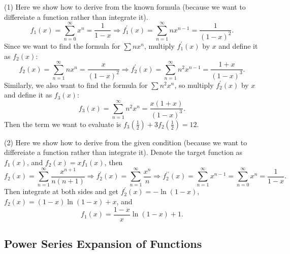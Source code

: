 \begin{solution}
  (1) Here we show how to derive from the known formula
  (because we want to differeiate a function rather than integrate it).
  \begin{equation}
    f_1(x) = \sum\limits_{n = 0}^{\infty} x^n = \frac{1}{1-x}
    \Rightarrow
    f_1^{\prime}(x) = \sum\limits_{n = 1}^{\infty} nx^{n-1} = \frac{1}{(1-x)^2}.
  \end{equation}
  Since we want to find the formula for $\sum nx^n$, multiply $f_1^{\prime}(x)$
  by $x$ and define it as $f_2(x)$:
  \begin{equation}
    f_2(x) = \sum\limits_{n = 1}^{\infty} nx^n = \frac{x}{(1-x)^2}
    \Rightarrow
    f_2^{\prime}(x) = \sum\limits_{n = 1}^{\infty} n^2x^{n-1} = \frac{1+x}{(1-x)^3}.
  \end{equation}
  Similarly, we also want to find the formula for $\sum n^2x^n$, so multiply $f_2^{\prime}(x)$
  by $x$ and define it as $f_3(x)$:
  \begin{equation}
    f_3(x) = \sum\limits_{n = 1}^{\infty} n^2x^n = \frac{x(1+x)}{(1-x)^3}.
  \end{equation}
  Then the term we want to evaluate is $f_3(\frac{1}{2}) + 3f_2(\frac{1}{2}) = 12$.

  (2) Here we show how to derive from the given condition
  (because we want to differeiate a function rather than integrate it).
  Denote the target function as $f_1(x)$, and $f_2(x) = xf_1(x)$, then
  \begin{equation}
    f_2(x) = \sum\limits_{n = 1}^{\infty} \frac{x^{n+1}}{n(n+1)}
    \Rightarrow f_2^{\prime}(x) = \sum\limits_{n = 1}^{\infty} \frac{x^n}{n}
    \Rightarrow f_2^{\prime\prime}(x) = \sum\limits_{n = 1}^{\infty} x^{n-1} = \sum\limits_{n = 0}^{\infty}x^n = \frac{1}{1-x}.
  \end{equation}
  Then integrate at both sides and get $f_2^{\prime}(x) = -\ln(1-x)$, $f_2(x) =
  (1-x)\ln(1-x) + x$, and
  \begin{equation}
    f_1(x) = \frac{1 - x}{x} \ln(1-x) + 1.
  \end{equation}
\end{solution}


\subsection{Power Series Expansion of Functions}




